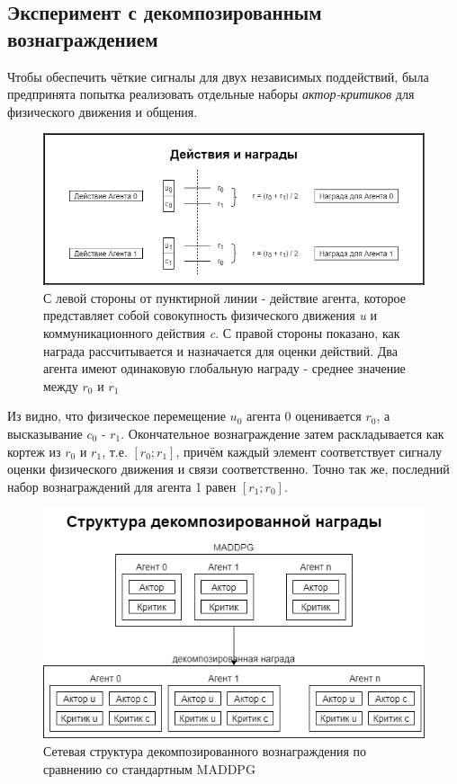 \subsection{Эксперимент с декомпозированным вознаграждением}

Чтобы обеспечить чёткие сигналы для двух независимых поддействий, была предпринята попытка реализовать отдельные наборы \textit{актор-критиков} для физического движения и общения.

\begin{figure}[ht!]
    \center
    \includegraphics [scale=0.60] {my_folder/images/ch4/actions_and_rewards.png}
    \caption{С левой стороны от пунктирной линии - действие агента, которое представляет собой совокупность физического движения \textit{u} и коммуникационного действия \textit{c}. С правой стороны показано, как награда рассчитывается и назначается для оценки действий. Два агента имеют одинаковую глобальную награду - среднее значение между $r_0$ и $r_1$}
    \label{fig:action-reward}
\end{figure}

Из  видно, что физическое перемещение $u_0$ агента 0 оценивается $r_0$, а высказывание $c_0$ - $r_1$. Окончательное вознаграждение затем раскладывается как кортеж из $r_0$ и $r_1$, т.е. $[r_0; r_1]$, причём каждый элемент соответствует сигналу оценки физического движения и связи соответственно. Точно так же, последний набор вознаграждений для агента 1 равен $[r_1; r_0]$.

\begin{figure}[ht!]
    \center
    \includegraphics [scale=0.60] {my_folder/images/ch4/decomposed_reward_structure.png}
    \caption{Сетевая структура декомпозированного вознаграждения по сравнению со стандартным MADDPG}
    \label{fig:decomposed-reward-structure}
\end{figure}

